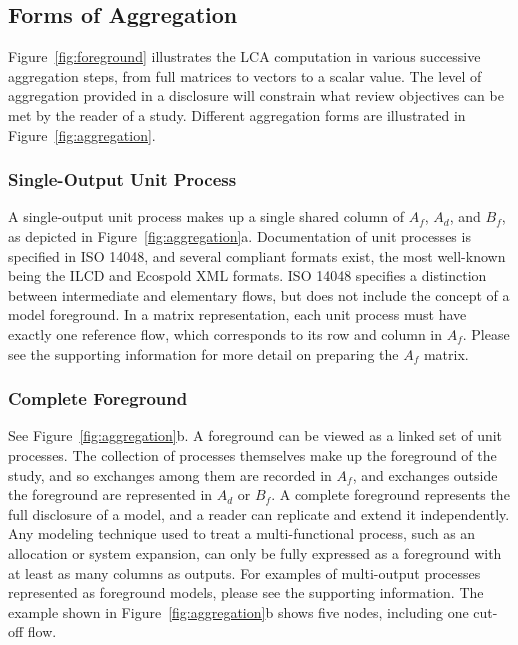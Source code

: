 \subsection{Forms of Aggregation}

Figure~\ref{fig:foreground} illustrates the LCA computation in various successive aggregation steps, from full matrices to vectors to a scalar value.  The level of aggregation provided in a disclosure will constrain what review objectives can be met by the reader of a study.  Different aggregation forms are illustrated in Figure~\ref{fig:aggregation}.

\subsubsection{Single-Output Unit Process}

A single-output unit process makes up a single shared column of $A_f$, $A_d$, and $B_f$, as depicted in Figure~\ref{fig:aggregation}a.  Documentation of unit processes is specified in ISO 14048, and several compliant formats exist, the most well-known being the ILCD and Ecospold XML formats.  ISO 14048 specifies a distinction between intermediate and elementary flows, but does not include the concept of a model foreground.  In a matrix representation, each unit process must have exactly one reference flow, which corresponds to its row and column in $A_f$.
Please see the supporting information for more detail on preparing the $A_f$ matrix.



\subsubsection{Complete Foreground}

See Figure~\ref{fig:aggregation}b.  A foreground can be viewed as a linked set of unit processes.  The collection of processes themselves make up the foreground of the study, and so exchanges among them are recorded in $A_f$, and exchanges outside the foreground are represented in $A_d$ or $B_f$.  A complete foreground represents
the full disclosure of a model, and a reader can replicate and extend it independently.
Any modeling technique used to treat a multi-functional process, such as an allocation or system expansion, can only be fully expressed as a foreground with at least as many columns as outputs.  For examples of multi-output processes represented as foreground models, please see the supporting information.  The example shown in Figure~\ref{fig:aggregation}b shows five nodes, including one cut-off flow.

